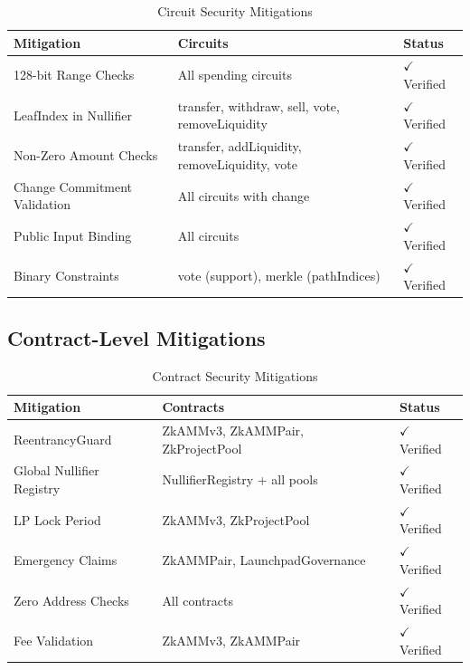 \documentclass[11pt,a4paper]{article}
\begin{document}
\begin{table}[H]
\centering
\begin{tabular}{|l|l|l|}
\hline
\textbf{Mitigation} & \textbf{Circuits} & \textbf{Status} \\
\hline
128-bit Range Checks & All spending circuits & $\checkmark$ Verified \\
LeafIndex in Nullifier & transfer, withdraw, sell, vote, removeLiquidity & $\checkmark$ Verified \\
Non-Zero Amount Checks & transfer, addLiquidity, removeLiquidity, vote & $\checkmark$ Verified \\
Change Commitment Validation & All circuits with change & $\checkmark$ Verified \\
Public Input Binding & All circuits & $\checkmark$ Verified \\
Binary Constraints & vote (support), merkle (pathIndices) & $\checkmark$ Verified \\
\hline
\end{tabular}
\caption{Circuit Security Mitigations}
\end{table}

\subsection{Contract-Level Mitigations}

\begin{table}[H]
\centering
\begin{tabular}{|l|l|l|}
\hline
\textbf{Mitigation} & \textbf{Contracts} & \textbf{Status} \\
\hline
ReentrancyGuard & ZkAMMv3, ZkAMMPair, ZkProjectPool & $\checkmark$ Verified \\
Global Nullifier Registry & NullifierRegistry + all pools & $\checkmark$ Verified \\
LP Lock Period & ZkAMMv3, ZkProjectPool & $\checkmark$ Verified \\
Emergency Claims & ZkAMMPair, LaunchpadGovernance & $\checkmark$ Verified \\
Zero Address Checks & All contracts & $\checkmark$ Verified \\
Fee Validation & ZkAMMv3, ZkAMMPair & $\checkmark$ Verified \\
\hline
\end{tabular}
\caption{Contract Security Mitigations}
\end{table}

\end{document}
